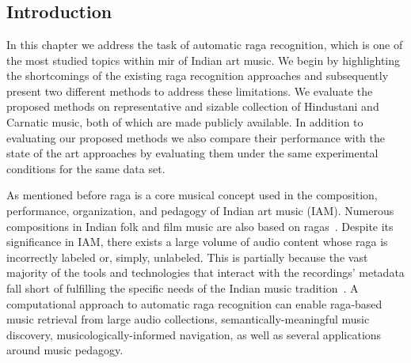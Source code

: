
\chapter{}
\label{chap:raga_recognition}




\section{Introduction}

In this chapter we address the task of automatic \gls{raga} recognition, which is one of the most studied topics within \gls{mir} of Indian art music. We begin by highlighting the shortcomings of the existing \gls{raga} recognition approaches and subsequently present two different methods to address these limitations. We evaluate the proposed methods on representative and sizable collection of Hindustani and Carnatic music, both of which are made publicly available. In addition to evaluating our proposed methods we also compare their performance with the state of the art approaches by evaluating them under the same experimental conditions for the same data set.  


As mentioned before \gls{raga} is a core musical concept used in the composition, performance, organization, and pedagogy of Indian art music (IAM). Numerous compositions in Indian folk and film music are also based on \glspl{raga}~\citep{ganti2013bollywood}. Despite its significance in IAM, there exists a large volume of audio content whose \gls{raga} is incorrectly labeled or, simply, unlabeled. This is partially because the vast majority of the tools and technologies that interact with the recordings' metadata fall short of fulfilling the specific needs of the Indian music tradition~\citep{XavierSerra2011}. A computational approach to automatic \gls{raga} recognition can enable \gls{raga}-based music retrieval from large audio collections, semantically-meaningful music discovery, musicologically-informed navigation, as well as several applications around music pedagogy. 

